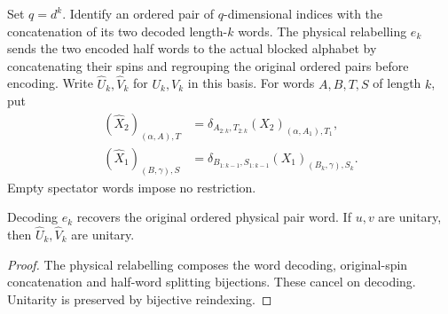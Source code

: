 \begin{definition}
    \label{def:mpu_printed_blocked_half_factors}
    \leanok
    Set $q=d^k$. Identify an ordered pair of $q$-dimensional indices with
    the concatenation of its two decoded length-$k$ words. The physical
    relabelling $e_k$ sends the two encoded half words to the actual
    blocked alphabet by concatenating their spins and regrouping the
    original ordered pairs before encoding.
    Write $\widehat U_k,\widehat V_k$ for $U_k,V_k$ in this basis.
    For words $A,B,T,S$ of length $k$, put
    \begin{align*}
        (\widehat X_2)_{(\alpha,A),T}
         & =\delta_{A_{2:k},T_{2:k}}(X_2)_{(\alpha,A_1),T_1},     \\
        (\widehat X_1)_{(B,\gamma),S}
         & =\delta_{B_{1:k-1},S_{1:k-1}}(X_1)_{(B_k,\gamma),S_k}.
    \end{align*}
    Empty spectator words impose no restriction.
\end{definition}

\begin{lemma}
    \label{lem:mpu_printed_blocked_coordinates}
    \leanok
    Decoding $e_k$ recovers the original ordered physical pair word.
    If $u,v$ are unitary, then $\widehat U_k,\widehat V_k$ are unitary.
\end{lemma}
\begin{proof}\leanok
    The physical relabelling composes the word decoding, original-spin
    concatenation and half-word splitting bijections. These cancel on
    decoding. Unitarity is preserved by bijective reindexing.
\end{proof}

